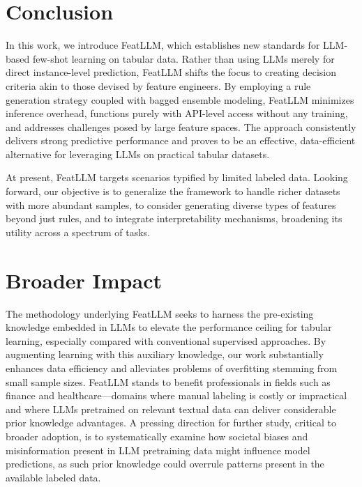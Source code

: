 \section{Conclusion}
In this work, we introduce \textsf{FeatLLM}, which establishes new standards for LLM-based few-shot learning on tabular data. Rather than using LLMs merely for direct instance-level prediction, \textsf{FeatLLM} shifts the focus to creating decision criteria akin to those devised by feature engineers. By employing a rule generation strategy coupled with bagged ensemble modeling, \textsf{FeatLLM} minimizes inference overhead, functions purely with API-level access without any training, and addresses challenges posed by large feature spaces. The approach consistently delivers strong predictive performance and proves to be an effective, data-efficient alternative for leveraging LLMs on practical tabular datasets.

At present, \textsf{FeatLLM} targets scenarios typified by limited labeled data. Looking forward, our objective is to generalize the framework to handle richer datasets with more abundant samples, to consider generating diverse types of features beyond just rules, and to integrate interpretability mechanisms, broadening its utility across a spectrum of tasks.

\section{Broader Impact} 
The methodology underlying \textsf{FeatLLM} seeks to harness the pre-existing knowledge embedded in LLMs to elevate the performance ceiling for tabular learning, especially compared with conventional supervised approaches. By augmenting learning with this auxiliary knowledge, our work substantially enhances data efficiency and alleviates problems of overfitting stemming from small sample sizes. \textsf{FeatLLM} stands to benefit professionals in fields such as finance and healthcare—domains where manual labeling is costly or impractical and where LLMs pretrained on relevant textual data can deliver considerable prior knowledge advantages. A pressing direction for further study, critical to broader adoption, is to systematically examine how societal biases and misinformation present in LLM pretraining data might influence model predictions, as such prior knowledge could overrule patterns present in the available labeled data.

